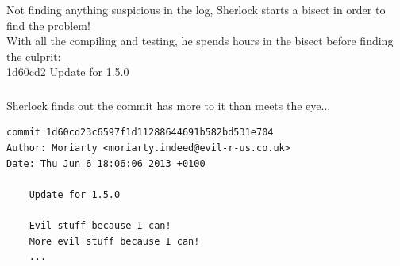 
\begin{frame}
  \frametitle{\insertsubsubsection}

  \begin{center}
    Not finding anything suspicious in the log, Sherlock starts a bisect in order to find the problem!\\\vspacing
    With all the compiling and testing, he spends hours in the bisect before finding the culprit:\\\vspacing
    \Large{1d60cd2 Update for 1.5.0}
  \end{center}

\end{frame}


\begin{frame}[fragile]
  \frametitle{\insertsubsubsection}

  \begin{center}
    Sherlock finds out the commit has more to it than meets the eye...\\\vspacing
  \end{center}

\begin{verbatim}
commit 1d60cd23c6597f1d11288644691b582bd531e704
Author: Moriarty <moriarty.indeed@evil-r-us.co.uk>
Date: Thu Jun 6 18:06:06 2013 +0100

    Update for 1.5.0

    Evil stuff because I can!
    More evil stuff because I can!
    ...
\end{verbatim}

\end{frame}


